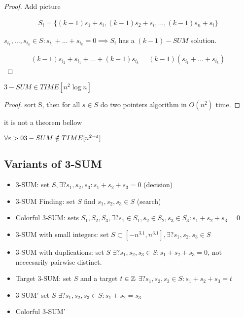 	\begin{proof}
		{\color{red} Add picture}

		\begin{align*}
			S_i = \{(k - 1)s_1 + s_i, (k - 1)s_2 + s_i, \ldots, (k - 1)s_n + s_i \}
		\end{align*}

		$s_{i_1}, \ldots, s_{i_k} \in S: s_{i_1} + \ldots + s_{i_k} = 0 \implies S_i $ has a $(k - 1)-SUM$ solution.

		\begin{align*}
			(k - 1)s_{i_2} + s_{i_1} + \ldots + (k - 1)s_{i_k} = (k - 1)(s_{i_1} + \ldots + s_{i_k})
		\end{align*}
	\end{proof}

	\begin{crly}
		$3-SUM \in TIME[n^2 \log n]$ 
	\end{crly}

	\begin{proof}
		sort S, then 
		for all $s \in S$ do two pointers algorithm in $O(n^2)$ time.
	\end{proof}
	
	{\color{red} it is not a theorem bellow}
	\begin{thm}
		$\forall \varepsilon > 0 3-SUM \notin TIME[n^{2 - \varepsilon}]$ 
	\end{thm}

\subsection{Variants of 3-SUM}

\begin{itemize}
	\item 3-SUM: set $S, \exists ? s_1, s_2, s_3 : s_1 + s_2 + s_3 = 0$ (decision)
	\item 3-SUM Finding: set $S$ find $s_1, s_2, s_3 \in S$ (search)
	\item Colorful 3-SUM: sets $S_1, S_2, S_3, \exists ? s_1 \in S_1, s_2 \in S_2, s_3 \in S_3: s_1 + s_2 + s_3 = 0$ 
	\item 3-SUM with small integers: set $S \subset [-n^{3.1}, n^{3.1}], \exists? s_1, s_2, s_3 \in S$  
	\item 3-SUM with duplications: set $S$ $\exists ? s_1, s_2, s_3 \in S: s_1 + s_2 + s_3 = 0$, not neccesarily pairwise distinct.
	\item Target 3-SUM: set $S$ and a target $t \in \mathbb{Z}$ $\exists ? s_1, s_2, s_3 \in S: s_1 + s_2 + s_3 = t$ 
	\item 3-SUM' set $S $ $\exists ? s_1, s_2, s_3 \in S: s_1 + s_2 = s_3$ 
	\item Colorful 3-SUM' 

\end{itemize}

